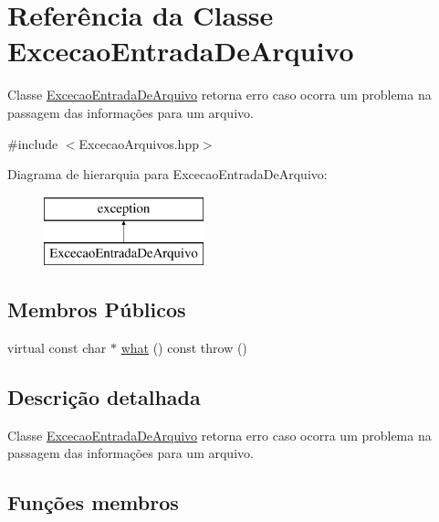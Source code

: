 \hypertarget{class_excecao_entrada_de_arquivo}{}\section{Referência da Classe Excecao\+Entrada\+De\+Arquivo}
\label{class_excecao_entrada_de_arquivo}


Classe \mbox{\hyperlink{class_excecao_entrada_de_arquivo}{Excecao\+Entrada\+De\+Arquivo}} retorna erro caso ocorra um problema na passagem das informações para um arquivo.  




{\ttfamily \#include $<$Excecao\+Arquivos.\+hpp$>$}

Diagrama de hierarquia para Excecao\+Entrada\+De\+Arquivo\+:\begin{figure}[H]
\begin{center}
\leavevmode
\includegraphics[height=2.000000cm]{class_excecao_entrada_de_arquivo}
\end{center}
\end{figure}
\subsection*{Membros Públicos}
\begin{DoxyCompactItemize}
\item 
virtual const char $\ast$ \mbox{\hyperlink{class_excecao_entrada_de_arquivo_abb6600772c45d366bb67ec89eb1a612a}{what}} () const  throw ()
\end{DoxyCompactItemize}


\subsection{Descrição detalhada}
Classe \mbox{\hyperlink{class_excecao_entrada_de_arquivo}{Excecao\+Entrada\+De\+Arquivo}} retorna erro caso ocorra um problema na passagem das informações para um arquivo. 

\subsection{Funções membros}
\mbox{\label{class_excecao_entrada_de_arquivo_abb6600772c45d366bb67ec89eb1a612a}} 

